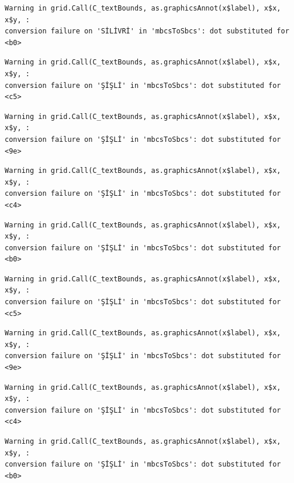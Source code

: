 \documentclass[
  11pt,
  a4paper,
  DIV=11,
  numbers=noendperiod]{scrartcl}
\begin{document}
\begin{verbatim}
Warning in grid.Call(C_textBounds, as.graphicsAnnot(x$label), x$x, x$y, :
conversion failure on 'SİLİVRİ' in 'mbcsToSbcs': dot substituted for <b0>
\end{verbatim}

\begin{verbatim}
Warning in grid.Call(C_textBounds, as.graphicsAnnot(x$label), x$x, x$y, :
conversion failure on 'ŞİŞLİ' in 'mbcsToSbcs': dot substituted for <c5>
\end{verbatim}

\begin{verbatim}
Warning in grid.Call(C_textBounds, as.graphicsAnnot(x$label), x$x, x$y, :
conversion failure on 'ŞİŞLİ' in 'mbcsToSbcs': dot substituted for <9e>
\end{verbatim}

\begin{verbatim}
Warning in grid.Call(C_textBounds, as.graphicsAnnot(x$label), x$x, x$y, :
conversion failure on 'ŞİŞLİ' in 'mbcsToSbcs': dot substituted for <c4>
\end{verbatim}

\begin{verbatim}
Warning in grid.Call(C_textBounds, as.graphicsAnnot(x$label), x$x, x$y, :
conversion failure on 'ŞİŞLİ' in 'mbcsToSbcs': dot substituted for <b0>
\end{verbatim}

\begin{verbatim}
Warning in grid.Call(C_textBounds, as.graphicsAnnot(x$label), x$x, x$y, :
conversion failure on 'ŞİŞLİ' in 'mbcsToSbcs': dot substituted for <c5>
\end{verbatim}

\begin{verbatim}
Warning in grid.Call(C_textBounds, as.graphicsAnnot(x$label), x$x, x$y, :
conversion failure on 'ŞİŞLİ' in 'mbcsToSbcs': dot substituted for <9e>
\end{verbatim}

\begin{verbatim}
Warning in grid.Call(C_textBounds, as.graphicsAnnot(x$label), x$x, x$y, :
conversion failure on 'ŞİŞLİ' in 'mbcsToSbcs': dot substituted for <c4>
\end{verbatim}

\begin{verbatim}
Warning in grid.Call(C_textBounds, as.graphicsAnnot(x$label), x$x, x$y, :
conversion failure on 'ŞİŞLİ' in 'mbcsToSbcs': dot substituted for <b0>
\end{verbatim}
\end{document}
